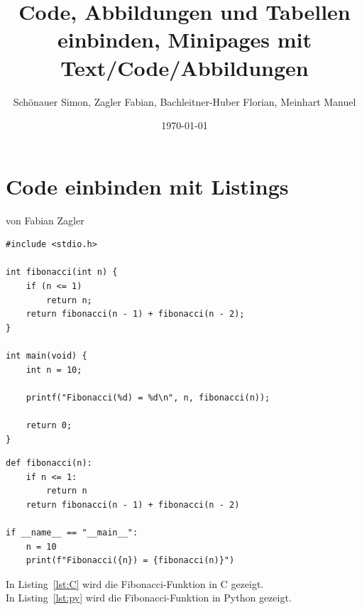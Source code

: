 \documentclass[a4paper,12pt]{article}
\title{Code, Abbildungen und Tabellen einbinden, Minipages mit Text/Code/Abbildungen}
\author{Schönauer Simon, Zagler Fabian, Bachleitner-Huber Florian, Meinhart Manuel}
\date{\today}
\begin{document}
\maketitle

\newpage

\centering
\section{Code einbinden mit Listings}
{\large von Fabian Zagler}

\vspace{1 cm}

\begin{lstlisting}[style=cstyle, caption={Code Beispiel mit cstyle Stil}, label={lst:C}]
#include <stdio.h>

int fibonacci(int n) {
    if (n <= 1)
        return n;
    return fibonacci(n - 1) + fibonacci(n - 2);
}

int main(void) {
    int n = 10;

    printf("Fibonacci(%d) = %d\n", n, fibonacci(n));

    return 0;
}
\end{lstlisting}



\begin{lstlisting}[style=pystyle, captionpos=b, caption={Beispiel einer Fibonacci-Funktion in Python}, label={lst:py}]
def fibonacci(n):
    if n <= 1:
        return n
    return fibonacci(n - 1) + fibonacci(n - 2)

if __name__ == "__main__":
    n = 10
    print(f"Fibonacci({n}) = {fibonacci(n)}")
\end{lstlisting}


\vspace{1 cm}


\noindent
In Listing~\ref{lst:C} wird die Fibonacci-Funktion in C gezeigt.\\
In Listing~\ref{lst:py} wird die Fibonacci-Funktion in Python gezeigt.



\newpage

\end{document}
